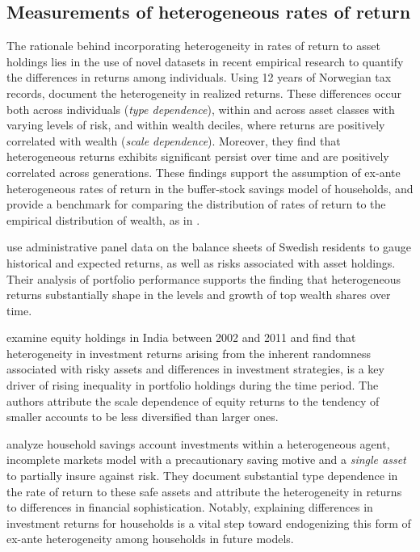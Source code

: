 \subsection{Measurements of heterogeneous rates of return}

\par The rationale behind incorporating heterogeneity in rates of return to asset holdings lies in the use of novel datasets in recent empirical research to quantify the differences in returns among individuals. Using 12 years of Norwegian tax records, \cite{aflgdmlp20} document the heterogeneity in realized returns. These differences occur both across individuals (\textit{type dependence}), within and across asset classes with varying levels of risk, and within wealth deciles, where returns are positively correlated with wealth  (\textit{scale dependence}). Moreover, they find that heterogeneous returns exhibits significant persist over time and are positively correlated across generations. These findings support the assumption of ex-ante heterogeneous rates of return in the buffer-stock savings model of households, and provide a benchmark for comparing the distribution of rates of return to the empirical distribution of wealth, as in \cite{cstw2017}. 

\par \cite{lblcps18} use administrative panel data on the balance sheets of Swedish residents to gauge historical and expected returns, as well as risks associated with asset holdings. Their analysis of portfolio performance supports the finding that heterogeneous returns substantially shape in the levels and growth of top wealth shares over time.

\par \cite{Campbell2019} examine equity holdings in India between 2002 and 2011 and find that heterogeneity in investment returns arising from the inherent randomness associated with risky assets and differences in investment strategies, is a key driver of rising inequality in portfolio holdings during the time period. The authors attribute the scale dependence of equity returns to the tendency of smaller accounts to be less diversified than larger ones.

\par \cite{Deuflhard2018} analyze household savings account investments within a heterogeneous agent, incomplete markets model with a precautionary saving motive and a \textit{single asset} to partially insure against risk. They document substantial type dependence in the rate of return to these safe assets and attribute the heterogeneity in returns to differences in financial sophistication. Notably, explaining differences in investment returns for households is a vital step toward endogenizing this form of ex-ante heterogeneity among households in future models.

